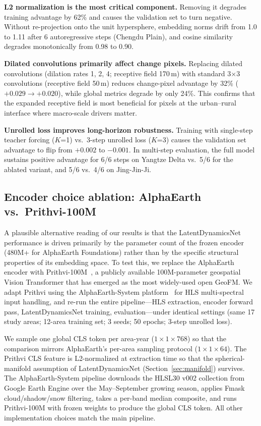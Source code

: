 \documentclass{article}
\begin{document}
\textbf{L2 normalization is the most critical component.} Removing it degrades training advantage by 62\% and causes the validation set to turn negative. Without re-projection onto the unit hypersphere, embedding norms drift from 1.0 to 1.11 after 6 autoregressive steps (Chengdu Plain), and cosine similarity degrades monotonically from 0.98 to 0.90.

\textbf{Dilated convolutions primarily affect change pixels.} Replacing dilated convolutions (dilation rates 1, 2, 4; receptive field 170\,m) with standard 3$\times$3 convolutions (receptive field 50\,m) reduces change-pixel advantage by 32\% ($+0.029 \to +0.020$), while global metrics degrade by only 24\%. This confirms that the expanded receptive field is most beneficial for pixels at the urban--rural interface where macro-scale drivers matter.

\textbf{Unrolled loss improves long-horizon robustness.} Training with single-step teacher forcing ($K$=1) vs.\ 3-step unrolled loss ($K$=3) causes the validation set advantage to flip from $+0.002$ to $-0.001$. In multi-step evaluation, the full model sustains positive advantage for 6/6 steps on Yangtze Delta vs.\ 5/6 for the ablated variant, and 5/6 vs.\ 4/6 on Jing-Jin-Ji.

\subsection{Encoder choice ablation: AlphaEarth vs.\ Prithvi-100M}
\label{sec:encoder_ablation}

A plausible alternative reading of our results is that the LatentDynamicsNet performance is driven primarily by the parameter count of the frozen encoder (480M+ for AlphaEarth Foundations) rather than by the specific structural properties of its embedding space. To test this, we replace the AlphaEarth encoder with Prithvi-100M~\citep{jakubik2024prithvi}, a publicly available 100M-parameter geospatial Vision Transformer that has emerged as the most widely-used open GeoFM. We adapt Prithvi using the AlphaEarth-System platform~\citep{zhouning2026alphaearthsystem} for HLS multi-spectral input handling, and re-run the entire pipeline---HLS extraction, encoder forward pass, LatentDynamicsNet training, evaluation---under identical settings (same 17 study areas; 12-area training set; 3 seeds; 50 epochs; 3-step unrolled loss).

We sample one global CLS token per area-year ($1 \times 1 \times 768$) so that the comparison mirrors AlphaEarth's per-area sampling protocol ($1 \times 1 \times 64$). The Prithvi CLS feature is L2-normalized at extraction time so that the spherical-manifold assumption of LatentDynamicsNet (Section~\ref{sec:manifold}) survives. The AlphaEarth-System pipeline downloads the HLSL30 v002 collection from Google Earth Engine over the May--September growing season, applies Fmask cloud/shadow/snow filtering, takes a per-band median composite, and runs Prithvi-100M with frozen weights to produce the global CLS token. All other implementation choices match the main pipeline.
\end{document}
